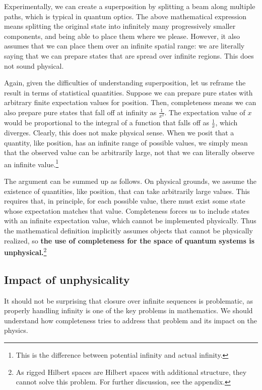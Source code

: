 \documentclass[10pt,twocolumn, nofootinbib]{revtex4-2}
\begin{document}
Experimentally, we can create a superposition by splitting a beam along multiple paths, which is typical in quantum optics. The above mathematical expression means splitting the original state into infinitely many progressively smaller components, and being able to place them where we please. However, it also assumes that we can place them over an infinite spatial range: we are literally saying that we can prepare states that are spread over infinite regions. This does not sound physical.

Again, given the difficulties of understanding superposition, let us reframe the result in terms of statistical quantities. Suppose we can prepare pure states with arbitrary finite expectation values for position. Then, completeness means we can also prepare pure states that fall off at infinity as $\frac{1}{x^2}$. The expectation value of $x$ would be proportional to the integral of a function that falls off as $\frac{1}{x}$, which diverges. Clearly, this does not make physical sense. When we posit that a quantity, like position, has an infinite range of possible values, we simply mean that the observed value can be arbitrarily large, not that we can literally observe an infinite value.\footnote{This is the difference between potential infinity and actual infinity.}

The argument can be summed up as follows. On physical grounds, we assume the existence of quantities, like position, that can take arbitrarily large values. This requires that, in principle, for each possible value, there must exist some state whose expectation matches that value. Completeness forces us to include states with an infinite expectation value, which cannot be implemented physically. Thus the mathematical definition implicitly assumes objects that cannot be physically realized, so \textbf{the use of completeness for the space of quantum systems is unphysical.}\footnote{As rigged Hilbert spaces are Hilbert spaces with additional structure, they cannot solve this problem. For further discussion, see the appendix.}

\subsection{Impact of unphysicality}

It should not be surprising that closure over infinite sequences is problematic, as properly handling infinity is one of the key problems in mathematics. We should understand how completeness tries to address that problem and its impact on the physics.
\end{document}
